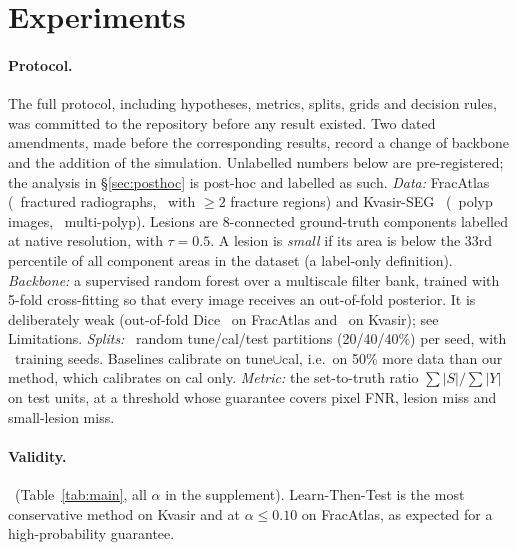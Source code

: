 \section{Experiments}\label{sec:exp}

\paragraph{Protocol.}
The full protocol, including hypotheses, metrics, splits, grids and decision
rules, was committed to the repository before any result existed. Two dated
amendments, made before the corresponding results, record a change of backbone
and the addition of the simulation. Unlabelled numbers below are pre-registered;
the analysis in \S\ref{sec:posthoc} is post-hoc and labelled as such.
\emph{Data:} FracAtlas~\cite{fracatlas2023} (\FracatlasUnits\ fractured
radiographs, \FracatlasMulti\ with $\ge2$ fracture regions) and
Kvasir-SEG~\cite{kvasir2020} (\KvasirSegUnits\ polyp images, \KvasirSegMulti\
multi-polyp). Lesions are 8-connected ground-truth components labelled at native
resolution, with $\tau=0.5$. A lesion is \emph{small} if its area is below the
33rd percentile of all component areas in the dataset (a label-only definition).
\emph{Backbone:} a supervised random forest over a multiscale filter bank,
trained with 5-fold cross-fitting so that every image receives an out-of-fold
posterior. It is deliberately weak (out-of-fold Dice \FracatlasDice\ on
FracAtlas and \KvasirSegDice\ on Kvasir); see Limitations.
\emph{Splits:} \KvasirSegReps\ random tune/cal/test partitions (20/40/40\%)
per seed, with \KvasirSegSeeds\ training seeds. Baselines calibrate on tune$\cup$cal,
i.e.\ on 50\% more data than our method, which calibrates on cal only.
\emph{Metric:} the set-to-truth ratio $\sum|S|/\sum|Y|$ on test units, at a
threshold whose guarantee covers pixel FNR, lesion miss and small-lesion miss.

\paragraph{Validity.}
\ResultValidity\ (Table~\ref{tab:main}, all $\alpha$ in the supplement).
Learn-Then-Test is the most conservative method on Kvasir and at
$\alpha\le0.10$ on FracAtlas, as expected for a high-probability guarantee.

\begin{table}[t]\centering\scriptsize
\caption{Kvasir-SEG, $\alpha=0.10$, test split, mean over \KvasirSegSeeds\
seeds$\times$\KvasirSegReps\ splits. Red: a claimed risk exceeds $\alpha$
(none). $\Delta$ is the paired relative change in set size.}\label{tab:main}

\end{table}

